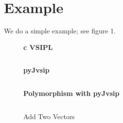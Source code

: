 \section*{Example}
We do a simple example; see figure 1. 

\begin{figure}[t]
\caption{Add Two Vectors}
\setlength{\parskip}{.25cm}
\begin{minipage}[t][5cm][t]{.5\textwidth}
{\begin{center} \bfseries{c VSIPL} \end{center}}\setlength{\parskip}{.25cm}
\inputminted[linenos=true,resetmargins=true,xleftmargin=.75cm,fontfamily=tt, fontsize= \tiny]{c}{./c_examples/example1.c}
\end{minipage}
\begin{minipage}[t][5cm][t]{.5\textwidth}
{\begin{center} \bfseries{pyJvsip} \end{center}}\setlength{\parskip}{.25cm}
\inputminted[linenos=true,resetmargins=true,xleftmargin=.75cm,fontfamily=tt,fontsize=\tiny]{python}{./pyJvsip_examples/example1a.py}\setlength{\parskip}{.25cm}
{\begin{center} \bfseries{Polymorphism with pyJvsip} \end{center}}\setlength{\parskip}{.25cm}
\inputminted[linenos=true,resetmargins=true,xleftmargin=.75cm,fontfamily=tt,fontsize=\tiny]{python}{./pyJvsip_examples/example1b.py}
\end{minipage}
\end{figure}

